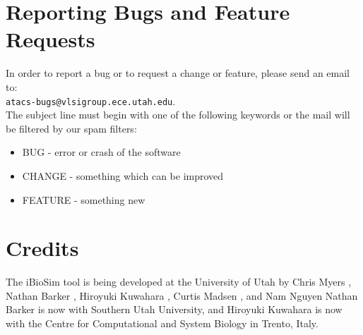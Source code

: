 \documentclass[titlepage,11pt]{article}
\begin{document}
\section{Reporting Bugs and Feature Requests}

\noindent
In order to report a bug or to request a change or feature, please
send an email to:\\ 
{\tt atacs-bugs@vlsigroup.ece.utah.edu}.\\
The subject line must begin with one of the following keywords or the
mail will be filtered by our spam filters:
\begin{itemize}
\item BUG - error or crash of the software
\item CHANGE - something which can be improved
\item FEATURE - something new
\end{itemize}

\section{Credits}

\noindent
The iBioSim tool is being developed at the University of Utah
by 
Chris Myers
,
Nathan Barker
,
Hiroyuki Kuwahara
,
Curtis Madsen
, and
Nam Nguyen
Nathan Barker is now with Southern Utah University, and Hiroyuki
Kuwahara is now with the Centre for Computational and System
Biology in Trento, Italy. 
  
\end{document}
